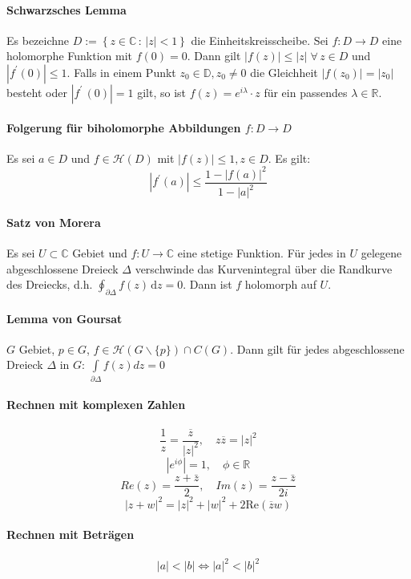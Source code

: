 \documentclass[a4paper, 10pt, DIV20, headings=small]{scrartcl}
\theoremstyle{definition}
\theoremstyle{plain}
\begin{document}
\paragraph{Schwarzsches Lemma}
Es bezeichne $D := \left\{z \in \mathbb{C} \,:\, |z| < 1 \right\}$ die Einheitskreisscheibe. Sei $f \colon D \to D$ eine holomorphe Funktion mit $f(0) = 0$. Dann gilt $|f(z)| \leq |z| \; \forall \, z \in D$ und $|f^\prime(0)|\leq 1$. Falls in einem Punkt $z_0 \in \mathbb{D}, z_0 \neq 0$ die Gleichheit $|f(z_0)| = |z_0|$ besteht oder $|f^\prime\!\,(0)| = 1$ gilt, so ist $f(z) = e^{i \lambda} \cdot z$ für ein passendes $\lambda \in \mathbb{R}$.

\paragraph{Folgerung für biholomorphe Abbildungen $f \colon D \rightarrow D$}
Es sei $a \in D$ und $f \in \mathcal{H}(D)$ mit $|f(z)| \leq 1, z \in D$. Es gilt:
$$|f^\prime(a)| \leq \frac{1 - |f(a)|^2}{1 - |a|^2}$$

\paragraph{Satz von Morera}
Es sei $U \subset \mathbb{C}$ Gebiet und $f \colon U \rightarrow \mathbb{C}$ eine stetige Funktion. Für jedes in $U$ gelegene abgeschlossene Dreieck $\Delta$ verschwinde das Kurvenintegral über die Randkurve des Dreiecks, d.h. $\oint_{\partial\Delta} f(z)\, \mathrm{d}z = 0$. Dann ist $f$ holomorph auf $U$.

\paragraph{Lemma von Goursat}
$G$ Gebiet, $p \in G$, $f \in \mathcal{H}(G \backslash\{p\}) \cap C(G)$. Dann gilt für jedes abgeschlossene Dreieck $\Delta$ in $G$:
$\int\limits_{\partial \Delta}{f(z)dz} = 0$

\paragraph{Rechnen mit komplexen Zahlen}
$$\frac{1}{z} = \frac{\overline{z}}{|z|^2}, \quad z \overline{z} = |z|^2$$
$$|e^{i \phi}| = 1, \quad \phi \in \mathbb{R}$$
$$Re(z) = \frac{z+\bar{z}}{2}, \quad Im(z) = \frac{z-\bar{z}}{2i}$$
$$|z+w|^2 = |z|^2+|w|^2 + 2 \text{Re}(\overline{z}w)$$

\paragraph{Rechnen mit Beträgen}
$$|a| < |b| \Leftrightarrow |a|^2 < |b|^2$$
\end{document}
